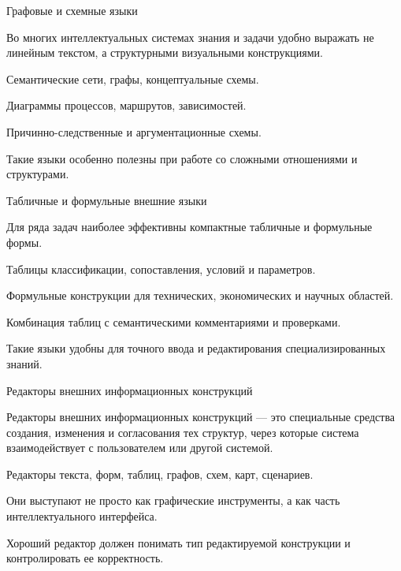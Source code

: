 \begin{frame}{Графовые и схемные языки}
	\topline
	\justifying

	Во многих интеллектуальных системах знания и задачи удобно выражать не линейным текстом, а структурными визуальными конструкциями.
	
	\begin{textitemize}
		\item Семантические сети, графы, концептуальные схемы.
		\item Диаграммы процессов, маршрутов, зависимостей.
		\item Причинно-следственные и аргументационные схемы.
		\item Такие языки особенно полезны при работе со сложными отношениями и структурами.
	\end{textitemize}
\end{frame}

\begin{frame}{Табличные и формульные внешние языки}
	\topline
	\justifying

	Для ряда задач наиболее эффективны компактные табличные и формульные формы.
	
	\begin{textitemize}
		\item Таблицы классификации, сопоставления, условий и параметров.
		\item Формульные конструкции для технических, экономических и научных областей.
		\item Комбинация таблиц с семантическими комментариями и проверками.
		\item Такие языки удобны для точного ввода и редактирования специализированных знаний.
	\end{textitemize}
\end{frame}

\begin{frame}{Редакторы внешних информационных конструкций}
	\topline
	\justifying

	Редакторы внешних информационных конструкций --- это специальные средства создания, изменения и согласования тех структур, через которые система взаимодействует с пользователем или другой системой.
	
	\begin{textitemize}
		\item Редакторы текста, форм, таблиц, графов, схем, карт, сценариев.
		\item Они выступают не просто как графические инструменты, а как часть интеллектуального интерфейса.
		\item Хороший редактор должен понимать тип редактируемой конструкции и контролировать ее корректность.
	\end{textitemize}
\end{frame}

